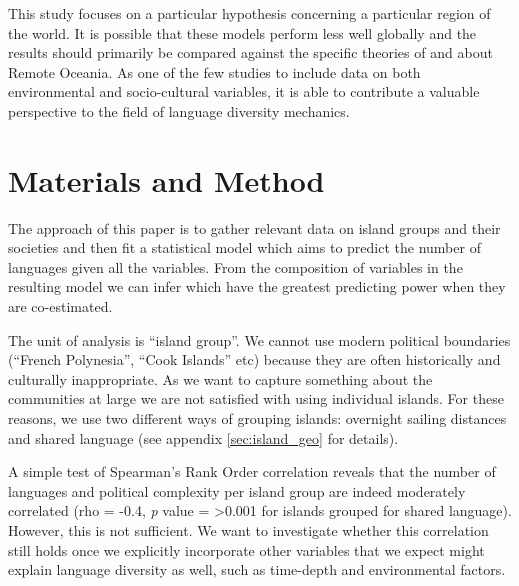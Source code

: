 \documentclass[a4paper,10pt]{article} %
\begin{document}
This study focuses on a particular hypothesis concerning a particular region of the world. It is possible that these models perform less well globally and the results should primarily be compared against the specific theories of \citet{lynch1981melanesian} and \citet{pawley81, pawley2007} about Remote Oceania. As one of the few studies to include data on both environmental and socio-cultural variables, it is able to contribute a valuable perspective to the field of language diversity mechanics.

\FloatBarrier



\FloatBarrier
\section{Materials and Method}
\label{pol_complex_method}
The approach of this paper is to gather relevant data on island groups and their societies and then fit a statistical model which aims to predict the number of languages given all the variables. From the composition of variables in the resulting model we can infer which have the greatest predicting power when they are co-estimated.

The unit of analysis is ``island group''. We cannot use modern political boundaries (``French Polynesia'', ``Cook Islands'' etc) because they are often historically and culturally inappropriate. As we want to capture something about the communities at large we are not satisfied with using individual islands. For these reasons, we use two different ways of grouping islands: overnight sailing distances and shared language (see appendix \ref{sec:island_geo} for details).


A simple test of Spearman's Rank Order correlation reveals that the number of languages and political complexity per island group are indeed moderately correlated (rho  = -0.4, \emph{p} value = >0.001 for islands grouped for shared language). However, this is not sufficient. We want to investigate whether this correlation still holds once we explicitly incorporate other variables that we expect might explain language diversity as well, such as time-depth and environmental factors. 
\end{document}
